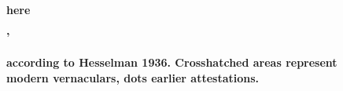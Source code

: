 \begin{figure}[h]

\begin{minipage}{5.8752in}

\bfseries
here

\end{minipage}

\end{figure}

\begin{stylecaption}

\end{stylecaption}

\begin{figure}[h]

\begin{minipage}{5.8752in}

\bfseries
’

\end{minipage}

\end{figure}

\begin{stylecaption}

\end{stylecaption}

\begin{figure}[h]

\begin{minipage}{5.8752in}

\bfseries
 according to Hesselman 1936. Crosshatched areas represent modern vernaculars, dots earlier attestations.

\end{minipage}

\end{figure}

\begin{stylecaption}

\end{stylecaption}

\begin{figure}[h]

\begin{minipage}{5.8752in}

\end{minipage}

\end{figure}

